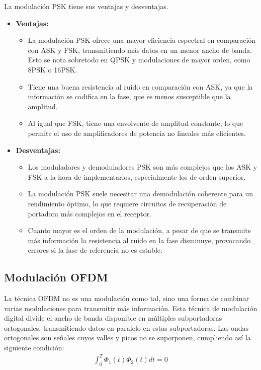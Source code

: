 \documentclass[12pt, letterpaper]{article}
\begin{document}
La modulación PSK tiene sus ventajas y desventajas.
\begin{itemize}
    \item \textbf{Ventajas:}
    \begin{itemize}
        \item La modulación PSK ofrece una mayor eficiencia espectral en comparación con ASK y FSK, transmitiendo más datos en un menor ancho de banda. Esto se nota sobretodo en QPSK y modulaciones de mayor orden, como 8PSK o 16PSK.\@
        \item Tiene una buena resistencia al ruido en comparación con ASK, ya que la información se codifica en la fase, que es menos susceptible que la amplitud.
        \item Al igual que FSK, tiene una envolvente de amplitud constante, lo que permite el uso de amplificadores de potencia no lineales más eficientes.
    \end{itemize}

    \item \textbf{Desventajas:}
    \begin{itemize}
        \item Los moduladores y demoduladores PSK son más complejos que los ASK y FSK a la hora de implementarlos, especialmente los de orden superior.
        \item La modulación PSK suele necesitar una demodulación coherente para un rendimiento óptimo, lo que requiere circuitos de recuperación de portadora más complejos en el receptor.
        \item Cuanto mayor es el orden de la modulación, a pesar de que se transmite más información la resistencia al ruido en la fase disminuye, provocando errores si la fase de referencia no es estable.
    \end{itemize}
\end{itemize}

\subsection{Modulación OFDM}
La técnica OFDM no es una modulación como tal, sino una forma de combinar varias modulaciones para transmitir más información. Esta técnica de modulación digital divide el ancho de banda disponible en múltiples subportadoras ortogonales, transmitiendo datos en paralelo en estas subportadoras. Las ondas ortogonales son señales cuyos valles y picos no se suporponen, cumpliendo así la siguiente condición:
\begin{align}
    \int_{0}^{T} \Phi_1(t) \Phi_2(t) dt = 0
\end{align}
\end{document}

